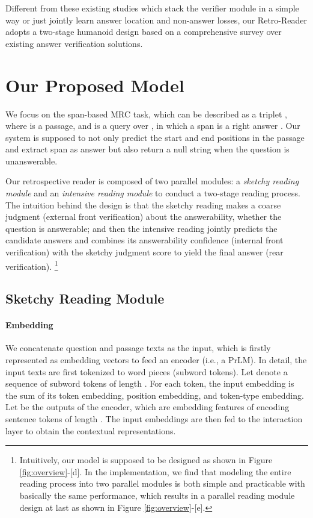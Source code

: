 \documentclass[letterpaper]{article} \usepackage{aaai21}  \usepackage{times}  \usepackage{helvet} \usepackage{courier}  \usepackage[hyphens]{url}  \usepackage{graphicx}
\begin{document}
Different from these existing studies which stack the verifier module in a simple way or just jointly learn answer location and non-answer losses, our Retro-Reader adopts a two-stage humanoid design \cite{DBLP:conf/sigir/ZhengMLYZM19,doi:10.1080/00461520.1987.9653053} based on a comprehensive survey over existing answer verification solutions.


\section{Our Proposed Model}
We focus on the span-based MRC task, which can be described as a triplet , where  is a passage, and  is a query over , in which a span is a right answer . Our system is supposed to not only predict the start and end positions in the passage  and extract span as answer  but also return a null string when the question is unanswerable. 

Our retrospective reader is composed of two parallel modules: a \textit{sketchy reading module} and an \textit{intensive reading module} to conduct a two-stage reading process. The intuition behind the design is that the sketchy reading makes a coarse judgment (external front verification) about the answerability, whether the question is answerable; and then the intensive reading jointly predicts the candidate answers and combines its answerability confidence (internal front verification) with the sketchy judgment score to yield the final answer (rear verification). 
\footnote{Intuitively, our model is supposed to be designed as shown in Figure \ref{fig:overview}-[d]. In the implementation, we find that modeling the entire reading process into two parallel modules is both simple and practicable with basically the same performance, which results in a parallel reading module design at last as shown in Figure \ref{fig:overview}-[e].}

\subsection{Sketchy Reading Module}
\paragraph{Embedding}
We concatenate question and passage texts as the input, which is firstly represented as embedding vectors to feed an encoder (i.e., a PrLM). In detail, 
the input texts are first tokenized to word pieces (subword tokens). Let  denote a sequence of subword tokens of length . 
For each token, the input embedding is the sum of its token embedding, position embedding, and token-type embedding. 
Let  be the outputs of the encoder, which are embedding features of encoding sentence tokens of length . The input embeddings are then fed to the interaction layer to obtain the contextual representations.
\end{document}
